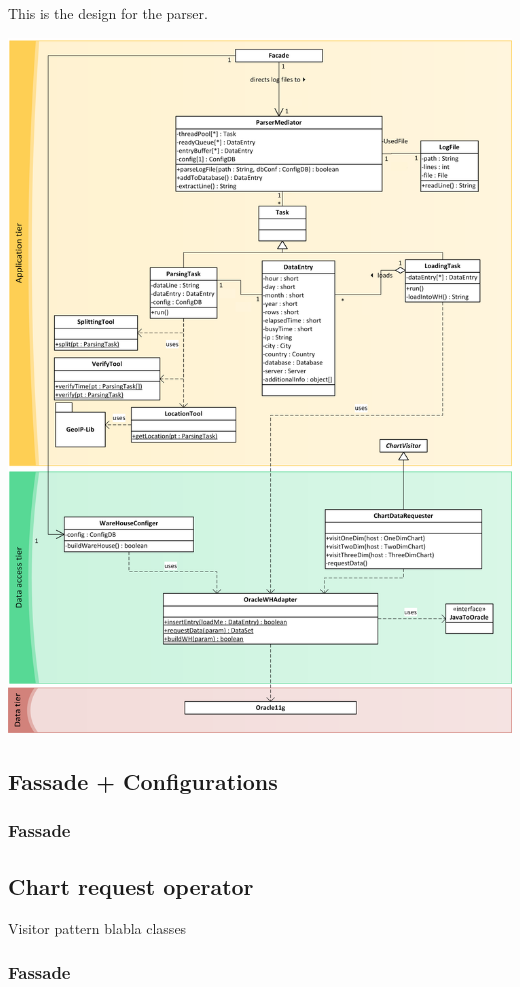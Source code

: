 This is the design for the parser. 

\begin{center}
\includegraphics[width=0.9\linewidth]{Pictures/AppTierDia2.png}
\end{center}  

\subsection{Fassade + Configurations}
\subsubsection{Fassade}


\subsection{Chart request operator}
Visitor pattern blabla   
classes
\subsubsection{Fassade}

